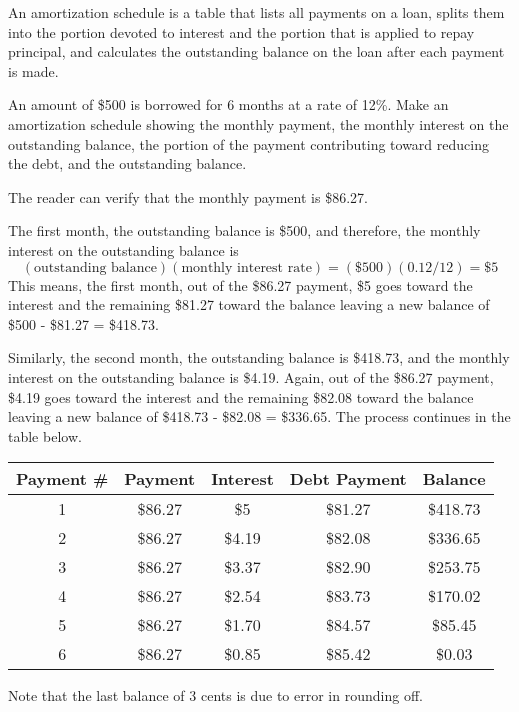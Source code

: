 An amortization schedule is a table that lists all payments on a loan, splits them into the portion devoted to interest and the portion that is applied to repay principal, and calculates the outstanding balance on the loan after each payment is made.

\begin{example}
    An amount of \$500 is borrowed for 6 months at a rate of 12\%. Make an amortization schedule showing the monthly payment, the monthly interest on the outstanding balance, the portion of the payment contributing toward reducing the debt, and the outstanding balance.
\end{example}
\begin{solution}
    The reader can verify that the monthly payment is \$86.27.

    The first month, the outstanding balance is \$500, and therefore, the monthly interest on the outstanding balance is
    \[
        (\text{outstanding balance})(\text{monthly interest rate}) = (\$500)(0.12/12) = \$5
    \]
    This means, the first month, out of the \$86.27 payment, \$5 goes toward the interest and the remaining \$81.27 toward the balance leaving a new balance of \$500 - \$81.27 = \$418.73.

    Similarly, the second month, the outstanding balance is \$418.73, and the monthly interest on the outstanding balance is \$4.19. Again, out of the \$86.27 payment, \$4.19 goes toward the interest and the remaining \$82.08 toward the balance leaving a new balance of \$418.73 - \$82.08 = \$336.65. The process continues in the table below.

    \begin{center}
        \begin{tabular}{ccccc}
            \hline
            Payment \# & Payment & Interest & Debt Payment & Balance  \\
            \hline
            1          & \$86.27 & \$5      & \$81.27      & \$418.73 \\
            2          & \$86.27 & \$4.19   & \$82.08      & \$336.65 \\
            3          & \$86.27 & \$3.37   & \$82.90      & \$253.75 \\
            4          & \$86.27 & \$2.54   & \$83.73      & \$170.02 \\
            5          & \$86.27 & \$1.70   & \$84.57      & \$85.45  \\
            6          & \$86.27 & \$0.85   & \$85.42      & \$0.03   \\
            \hline
        \end{tabular}
    \end{center}

    Note that the last balance of 3 cents is due to error in rounding off.
\end{solution}


